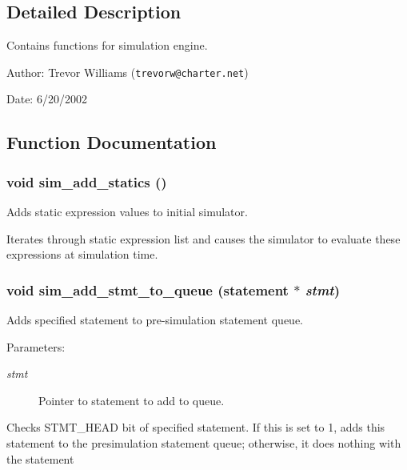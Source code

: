 \subsection{Detailed Description}
Contains functions for simulation engine. 

\begin{Desc}
\item[Author:]Trevor Williams ({\tt trevorw@charter.net}) \end{Desc}
\begin{Desc}
\item[Date:]6/20/2002 \end{Desc}


\subsection{Function Documentation}
\subsubsection{\setlength{\rightskip}{0pt plus 5cm}void sim\_\-add\_\-statics ()}\label{sim_8h_a3}


Adds static expression values to initial simulator. 

Iterates through static expression list and causes the simulator to evaluate these expressions at simulation time. 
\subsubsection{\setlength{\rightskip}{0pt plus 5cm}void sim\_\-add\_\-stmt\_\-to\_\-queue ({\bf statement} $\ast$ {\em stmt})}\label{sim_8h_a1}


Adds specified statement to pre-simulation statement queue. 

\begin{Desc}
\item[Parameters:]
\begin{description}
\item[{\em stmt}]Pointer to statement to add to queue.\end{description}
\end{Desc}
Checks STMT\_\-HEAD bit of specified statement. If this is set to 1, adds this statement to the presimulation statement queue; otherwise, it does nothing with the statement 

